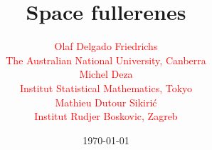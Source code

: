 \documentclass{beamer}
\begin{document}
\title{Space fullerenes}
\author{
{\small
\begin{multicols}{2}
\textcolor{red}{\large Olaf Delgado Friedrichs}\\[2mm]
\textcolor{red}{The Australian National University, Canberra}\\[2mm]
\textcolor{red}{\large Michel Deza}\\[2mm]
\textcolor{red}{Institut Statistical Mathematics, Tokyo}
\end{multicols}
\begin{center}
\textcolor{red}{\large Mathieu Dutour Sikiri\'c}\\[2mm]
\textcolor{red}{Institut Rudjer Boskovic, Zagreb}
\end{center}
}
}
\date{\today} 

\frame{\titlepage} 

%


\end{document}
